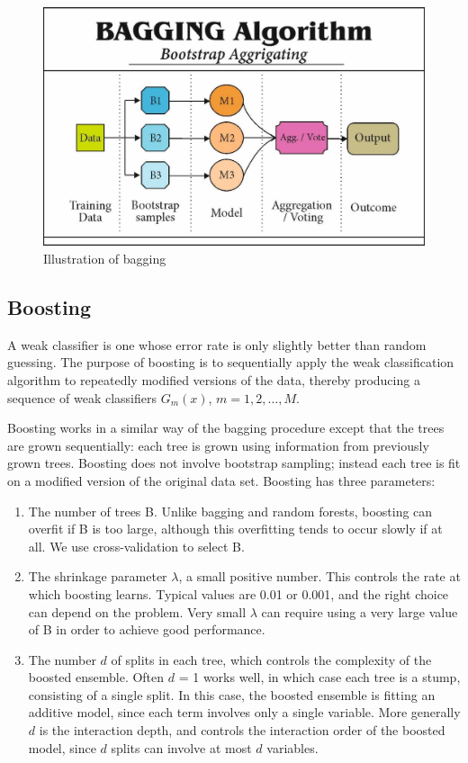 \begin{figure}[H]
\centering
\caption{Illustration of bagging}
\includegraphics[scale=0.2]{Figures/bagging.jpg}
\end{figure}


\subsection{Boosting}
A weak classifier is one whose error rate is only slightly better than
random guessing. The purpose of boosting is to sequentially apply the
weak classification algorithm to repeatedly modified versions of the data,
thereby producing a sequence of weak classifiers $G_m(x)$, $m = 1, 2,\dots, M$.

Boosting works in a similar way of the bagging procedure except that the trees are grown sequentially: each tree is grown using information from previously grown trees. Boosting does not involve bootstrap sampling; instead each tree is fit on a modified version of the original data set. Boosting has three parameters:

\begin{enumerate}
    \item The number of trees B. Unlike bagging and random forests, boosting can overfit if B is too large, although this overfitting tends to occur slowly if at all. We use cross-validation to select B.
    
    \item The shrinkage parameter $\lambda$, a small positive number. This controls the rate at which boosting learns. Typical values are 0.01 or 0.001, and the right choice can depend on the problem. Very small $\lambda$ can require using a very large value of B in order to achieve good performance.
    
    \item The number $d$ of splits in each tree, which controls the complexity of the boosted ensemble. Often $d$ = 1 works well, in which case each tree is a stump, consisting of a single split. In this case, the boosted ensemble is fitting an additive model, since each term involves only a single variable. More generally $d$ is the interaction depth, and controls the interaction order of the boosted model, since $d$ splits can involve at most $d$ variables.
\end{enumerate}

